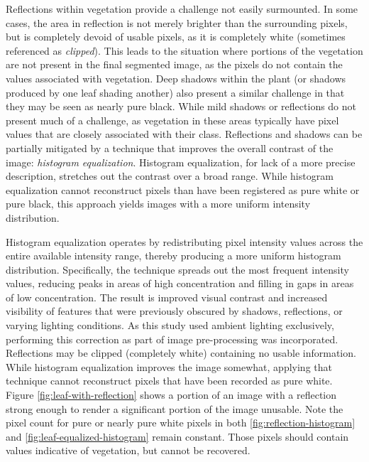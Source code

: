 \documentclass[letterpaper, notitlepage]{report}
\begin{document}
Reflections within vegetation provide a challenge not easily surmounted.  In some cases, the area in reflection is not merely brighter than the surrounding pixels, but is completely devoid of usable pixels, as it is completely white (sometimes referenced as \textit{clipped}). This leads to the situation where portions of the vegetation are not present in the final segmented image, as the pixels do not contain the values associated with vegetation.  Deep shadows within the plant (or shadows produced by one leaf shading another) also present a similar challenge in that they may be seen as nearly pure black. While mild shadows or reflections do not present much of a challenge, as vegetation in these areas typically have pixel values that are closely associated with their class. Reflections and shadows can be partially mitigated by a technique that improves the overall contrast of the image: \textit{histogram equalization}. Histogram equalization, for lack of a more precise description, stretches out the contrast over a broad range. While histogram equalization cannot reconstruct pixels than have been registered as pure white or pure black, this approach yields images with a more uniform intensity distribution.

Histogram equalization operates by redistributing pixel intensity values across the entire available intensity range, thereby producing a more uniform histogram distribution. Specifically, the technique spreads out the most frequent intensity values, reducing peaks in areas of high concentration and filling in gaps in areas of low concentration. The result is improved visual contrast and increased visibility of features that were previously obscured by shadows, reflections, or varying lighting conditions. As this study used ambient lighting exclusively, performing this correction as part of image pre-processing was incorporated. Reflections may be clipped (completely white) containing no usable information. While histogram equalization improves the image somewhat, applying that technique cannot reconstruct pixels that have been recorded as pure white. Figure \ref{fig:leaf-with-reflection} shows a portion of an image with a reflection strong enough to render a significant portion of the image unusable. Note the pixel count for pure or nearly pure white pixels in both \ref{fig:reflection-histogram} and \ref{fig:leaf-equalized-histogram} remain constant.  Those pixels should contain values indicative of vegetation, but cannot be recovered.
\end{document}
